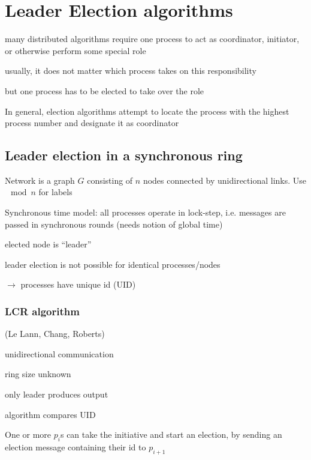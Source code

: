 \chapter{Leader Election algorithms}

\begin{compactitem}
	\item many distributed algorithms require one process to act as coordinator, initiator, or otherwise perform some special role
	\item usually, it does not matter which process takes on this responsibility
	\item but one process has to be elected to take over the role 
	\item In general, election algorithms attempt to locate the process with the highest process number and designate it as coordinator
\end{compactitem}

\section{Leader election in a synchronous ring}
\begin{compactitem}
	\item Network is a graph $G$ consisting of $n$ nodes connected by unidirectional links. Use $\mod n$ for labels
	\item Synchronous time model: all processes operate in lock-step, i.e. messages are passed in synchronous rounds (needs notion of global time)
\end{compactitem}

\begin{compactitem}
\item elected node is ``leader''
\item leader election is not possible for identical processes/nodes
\item [$\rightarrow$] processes have unique id (UID)
\end{compactitem}

\subsection{LCR algorithm}
(Le Lann, Chang, Roberts)\\

\begin{compactitem}
\item unidirectional communication
\item ring size unknown
\item only leader produces output
\item algorithm compares UID
\item One or more $p_i$s can take the initiative and start an election, by sending an election message containing their id to $p_{i+1}$
\end{compactitem}

